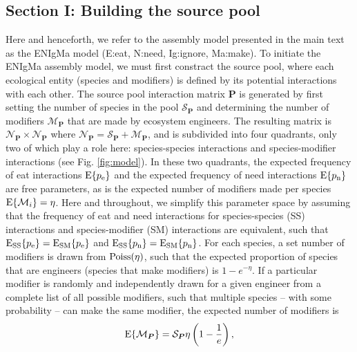 \documentclass[twocolumn,preprintnumbers,amsmath,amssymb,superscriptaddress]{revtex4}
\newcommand{\rr}[1]{{\rm #1}}
\begin{document}
\subsection*{Section I: Building the source pool}
Here and henceforth, we refer to the assembly model presented in the main text as the ENIgMa model (E:eat, N:need, Ig:ignore, Ma:make).
To initiate the ENIgMa assembly model, we must first constract the source pool, where each ecological entity (species and modifiers) is defined by its potential interactions with each other.
The source pool interaction matrix $\bm P$ is generated by first setting the number of species in the pool $\mathcal{S}_{\bm P}$ and determining the number of modifiers $\mathcal{M}_{\bm P}$ that are made by ecosystem engineers.
The resulting matrix is $\mathcal{N}_{\bm P}\times\mathcal{N}_{\bm P}$ where $\mathcal{N}_{\bm P}=\mathcal{S}_{\bm P}+\mathcal{M}_{\bm P}$, and is subdivided into four quadrants, only two of which play a role here: species-species interactions and species-modifier interactions (see Fig. \ref{fig:model}).
In these two quadrants, the expected frequency of eat interactions ${\rm E}\{p_\rr{e}\}$ and the expected frequency of need interactions ${\rm E}\{p_\rr{n}\}$ are free parameters, as is the expected number of modifiers made per species ${\rm E}\{\mathcal{M}_i\}=\eta$.
Here and throughout, we simplify this parameter space by assuming that the frequency of eat and need interactions for species-species (SS) interactions and species-modifier (SM) interactions are equivalent, such that ${\rm E_{SS}}\{p_\rr{e}\} = {\rm E_{SM}}\{p_\rr{e}\}$ and ${\rm E_{SS}}\{p_\rr{n}\} = {\rm E_{SM}}\{p_\rr{n}\}$.
For each species, a set number of modifiers is drawn from ${\rm Poiss}(\eta)$, such that the expected proportion of species that are engineers (species that make modifiers) is $1-{e}^{-\eta}$.
If a particular modifier is randomly and independently drawn for a given engineer from a complete list of all possible modifiers, such that multiple species -- with some probability -- can make the same modifier, the expected number of modifiers is
\begin{equation}
{\rm E}\{\mathcal{M}_{\bm P}\} = \mathcal{S}_{\bm P}\eta\left(1 - \frac{1}{{e}}\right),
\label{eq:total}
\end{equation}
\end{document}
